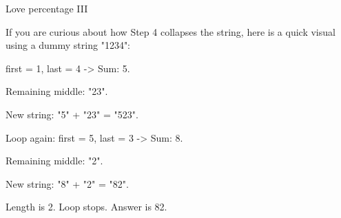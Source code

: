 \begin{tutorial}{Love percentage III}

If you are curious about how Step 4 collapses the string, here is a quick visual using a dummy string "1234":

first = 1, last = 4 -> Sum: 5.

Remaining middle: "23".

New string: "5" + "23" = "523".

Loop again: first = 5, last = 3 -> Sum: 8.

Remaining middle: "2".

New string: "8" + "2" = "82".

Length is 2. Loop stops. Answer is 82.

\end{tutorial}
